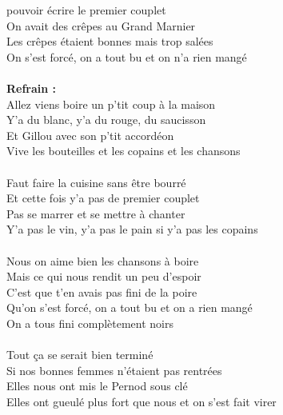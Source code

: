 
 pouvoir écrire le premier couplet
\\On avait des crêpes au Grand Marnier
\\Les crêpes étaient bonnes mais trop salées
\\On s'est forcé, on a tout bu et on n'a rien mangé
\\\\\textbf{Refrain :}
\\Allez viens boire un p'tit coup à la maison
\\Y'a du blanc, y'a du rouge, du saucisson
\\Et Gillou avec son p'tit accordéon
\\Vive les bouteilles et les copains et les chansons
\\\\Faut faire la cuisine sans être bourré
\\Et cette fois y'a pas de premier couplet
\\Pas se marrer et se mettre à chanter
\\Y'a pas le vin, y'a pas le pain si y'a pas les copains
\\\\Nous on aime bien les chansons à boire
\\Mais ce qui nous rendit un peu d'espoir
\\C'est que t'en avais pas fini de la poire
\\Qu'on s'est forcé, on a tout bu et on a rien mangé
\\On a tous fini complètement noirs
\\\\Tout ça se serait bien terminé
\\Si nos bonnes femmes n'étaient pas rentrées
\\Elles nous ont mis le Pernod sous clé
\\Elles ont gueulé plus fort que nous et on s'est fait virer

\breakpage